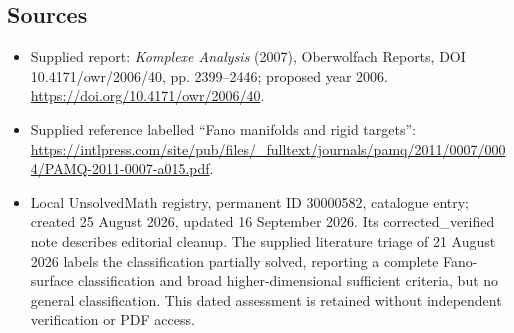 \documentclass[11pt]{article}
\begin{document}
\subsection{Sources}
\begin{itemize}
\item Supplied report: \emph{Komplexe Analysis} (2007), Oberwolfach Reports, DOI 10.4171/owr/2006/40, pp. 2399--2446; proposed year 2006. \url{https://doi.org/10.4171/owr/2006/40}.
\item Supplied reference labelled ``Fano manifolds and rigid targets'': \url{https://intlpress.com/site/pub/files/_fulltext/journals/pamq/2011/0007/0004/PAMQ-2011-0007-a015.pdf}.
\item Local UnsolvedMath registry, permanent ID 30000582, catalogue entry; created 25 August 2026, updated 16 September 2026. Its corrected\_verified note describes editorial cleanup. The supplied literature triage of 21 August 2026 labels the classification partially solved, reporting a complete Fano-surface classification and broad higher-dimensional sufficient criteria, but no general classification. This dated assessment is retained without independent verification or PDF access.
\end{itemize}
\end{document}
